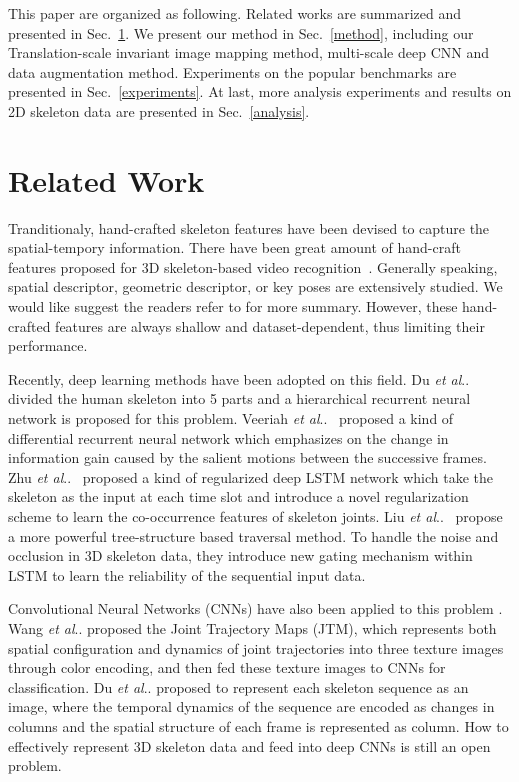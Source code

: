 \documentclass[10pt,journal]{IEEEtran}
\makeatletter
\DeclareRobustCommand\onedot{\futurelet\@let@token\@onedot}
\def\@onedot{\ifx\@let@token.\else.\null\fi\xspace}
\def\etal{\emph{et al}\onedot}
\makeatother
\begin{document}
This paper are organized as following. Related works are summarized and presented in Sec.~\ref{rel-work}. We present our method in Sec.~\ref{method}, including our Translation-scale invariant image mapping method, multi-scale deep CNN and data augmentation method. Experiments on the popular benchmarks are presented in Sec.~\ref{experiments}. At last, more analysis experiments and results on 2D skeleton data are presented in Sec.~\ref{analysis}.



\section{Related Work}\label{rel-work}

Tranditionaly, hand-crafted skeleton features have been devised to capture the spatial-tempory information. There have been great amount of hand-craft features proposed for 3D skeleton-based video recognition~\cite{ Wu2014Leveraging, Vemulapalli2014Human, Barnachon2014Ongoing, Vemulapalli2016R3DG, Vemulapalli2016Rolling}. Generally speaking, spatial descriptor, geometric descriptor, or key poses are extensively studied. We would like suggest the readers refer to \cite{Presti20163D} for more summary. However, these hand-crafted features are always shallow and dataset-dependent, thus limiting their performance.

Recently, deep learning methods have been adopted on this field. Du \etal~\cite{Du2015Hierarchical} divided the human skeleton into 5 parts and a hierarchical recurrent neural network is proposed for this problem. Veeriah \etal~\cite{Veeriah2015Differential} proposed a kind of differential recurrent neural network which emphasizes on the change in information gain caused by the salient motions between the successive frames. Zhu \etal~\cite{Zhu2016Co} proposed a kind of regularized deep LSTM network which take the skeleton as the input at each time slot and introduce a novel regularization scheme to learn the co-occurrence features of skeleton joints. Liu \etal~\cite{Liu2016Spatio} propose a more powerful tree-structure based traversal method. To handle the noise and occlusion in 3D skeleton data, they introduce new gating mechanism within LSTM to learn the reliability of the sequential input data. 

Convolutional Neural Networks (CNNs) have also been applied to this problem \cite{Wang2016Action, Yong2015Skeleton}. Wang \etal \cite{Wang2016Action} proposed the Joint Trajectory Maps (JTM), which represents both spatial configuration and dynamics of joint trajectories into three texture images through color encoding, and then fed these texture images to CNNs for classification. Du \etal \cite{Yong2015Skeleton} proposed to represent each skeleton sequence as an image, where the temporal dynamics of the sequence are encoded as changes in columns and the spatial structure of each frame is represented as column. How to effectively represent 3D skeleton data and feed into deep CNNs is still an open problem.
\end{document}
